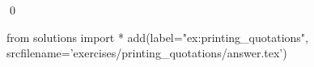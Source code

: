 
\begin{ex} 
  \label{ex:printing_quotations}
  
  \qed
\end{ex} 
\begin{python0}
from solutions import *
add(label="ex:printing_quotations",
    srcfilename='exercises/printing_quotations/answer.tex') 
\end{python0}

